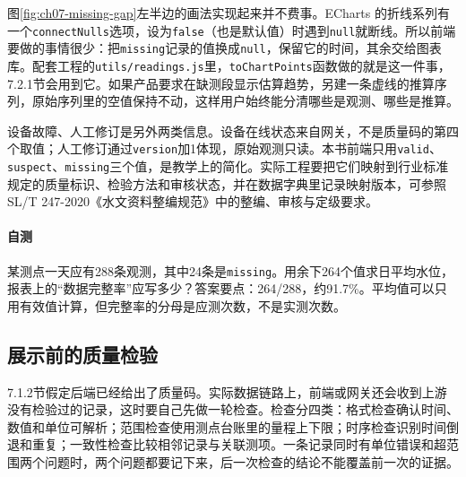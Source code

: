 图\ref{fig:ch07-missing-gap}左半边的画法实现起来并不费事。ECharts 的折线系列有一个\texttt{connectNulls}选项，设为\texttt{false}（也是默认值）时遇到\texttt{null}就断线。所以前端要做的事情很少：把\texttt{missing}记录的值换成\texttt{null}，保留它的时间，其余交给图表库。配套工程的\texttt{utils/readings.js}里，\texttt{toChartPoints}函数做的就是这一件事，7.2.1节会用到它。如果产品要求在缺测段显示估算趋势，另建一条虚线的推算序列，原始序列里的空值保持不动，这样用户始终能分清哪些是观测、哪些是推算。

设备故障、人工修订是另外两类信息。设备在线状态来自网关，不是质量码的第四个取值；人工修订通过\texttt{version}加1体现，原始观测只读。本书前端只用\texttt{valid}、\texttt{suspect}、\texttt{missing}三个值，是教学上的简化。实际工程要把它们映射到行业标准规定的质量标识、检验方法和审核状态，并在数据字典里记录映射版本，可参照SL/T 247-2020《水文资料整编规范》中的整编、审核与定级要求\cite{slt2472020}。

\paragraph{自测}某测点一天应有288条观测，其中24条是\texttt{missing}。用余下264个值求日平均水位，报表上的“数据完整率”应写多少？答案要点：264/288，约91.7\%。平均值可以只用有效值计算，但完整率的分母是应测次数，不是实测次数。

\subsection{展示前的质量检验}

7.1.2节假定后端已经给出了质量码。实际数据链路上，前端或网关还会收到上游没有检验过的记录，这时要自己先做一轮检查。检查分四类：格式检查确认时间、数值和单位可解析；范围检查使用测点台账里的量程上下限；时序检查识别时间倒退和重复；一致性检查比较相邻记录与关联测项。一条记录同时有单位错误和超范围两个问题时，两个问题都要记下来，后一次检查的结论不能覆盖前一次的证据。

